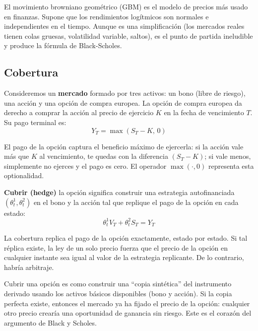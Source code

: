 \documentclass[12pt]{article}
\begin{document}
\begin{intuicion}
El movimiento browniano geom\'etrico (GBM) es el modelo de precios m\'as usado en finanzas. Supone que los rendimientos log\'itmicos son normales e independientes en el tiempo. Aunque es una simplificaci\'on (los mercados reales tienen colas gruesas, volatilidad variable, saltos), es el punto de partida ineludible y produce la f\'ormula de Black-Scholes.
\end{intuicion}

\subsection{Cobertura}

Consideremos un \textbf{mercado} formado por tres activos: un bono (libre de riesgo), una acci\'on y una opci\'on de compra europea. La opci\'on de compra europea da derecho a comprar la acci\'on al precio de ejercicio $K$ en la fecha de vencimiento $T$. Su pago terminal es:
\begin{equation}
  Y_T = \max(S_T - K, \, 0)
\end{equation}

\begin{intuicionmat}
El pago de la opci\'on captura el beneficio m\'aximo de ejercerla: si la acci\'on vale m\'as que $K$ al vencimiento, te quedas con la diferencia $(S_T - K)$; si vale menos, simplemente no ejerces y el pago es cero. El operador $\max(\cdot, 0)$ representa esta optionalidad.
\end{intuicionmat}

\textbf{Cubrir (hedge)} la opci\'on significa construir una estrategia autofinanciada $(\theta_t^1, \theta_t^2)$ en el bono y la acci\'on tal que replique el pago de la opci\'on en cada estado:
\begin{equation}
  \theta_t^1 V_T + \theta_t^2 S_T = Y_T
\end{equation}

\begin{intuicionmat}
La cobertura replica el pago de la opci\'on exactamente, estado por estado. Si tal r\'eplica existe, la ley de un solo precio fuerza que el precio de la opci\'on en cualquier instante sea igual al valor de la estrategia replicante. De lo contrario, habr\'ia arbitraje.
\end{intuicionmat}

\begin{intuicion}
Cubrir una opci\'on es como construir una ``copia sintética'' del instrumento derivado usando los activos b\'asicos disponibles (bono y acci\'on). Si la copia perfecta existe, entonces el mercado ya ha fijado el precio de la opci\'on: cualquier otro precio crear\'ia una oportunidad de ganancia sin riesgo. Este es el coraz\'on del argumento de Black y Scholes.
\end{intuicion}
\end{document}
